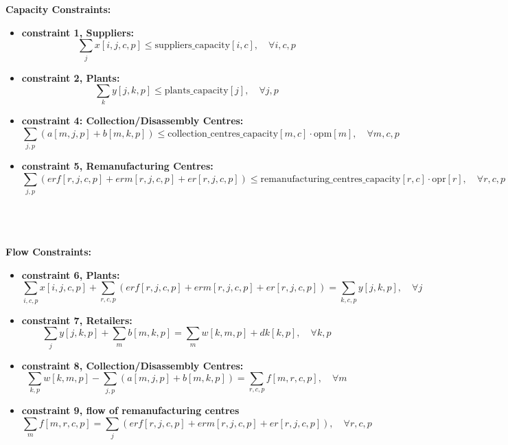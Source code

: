 \documentclass{article}
\begin{document}
    \textbf{Capacity Constraints:}
    \begin{itemize}
        \item \textbf{constraint 1, Suppliers:}
        \[
            \sum_{j} x[i,j,c,p] \leq \text{suppliers\_capacity}[i,c], \quad \forall i, c, p
        \]

        \item \textbf{constraint 2, Plants:}
        \[
            \sum_{k} y[j,k,p] \leq \text{plants\_capacity}[j], \quad \forall j, p
        \]

        \item \textbf{constraint 4: Collection/Disassembly Centres:}
        \[
            \sum_{j,p} (a[m,j,p] + b[m,k,p]) \leq \text{collection\_centres\_capacity}[m,c] \cdot \text{opm}[m], \quad \forall m, c, p
        \]

        \item \textbf{constraint 5, Remanufacturing Centres:}
        \[
            \sum_{j,p} (erf[r,j,c,p] + erm[r,j,c,p] + er[r,j,c,p]) \leq \text{remanufacturing\_centres\_capacity}[r,c] \cdot \text{opr}[r], \quad \forall r, c, p
        \]\\
        \\
        \\
    \end{itemize}

    \textbf{Flow Constraints:}
    \begin{itemize}
        \item \textbf{constraint 6, Plants:}
        \[
            \sum_{i,c,p} x[i,j,c,p] + \sum_{r,c,p} (erf[r,j,c,p] + erm[r,j,c,p] + er[r,j,c,p]) = \sum_{k,c,p} y[j,k,p], \quad \forall j
        \]

        \item \textbf{constraint 7, Retailers:}
        \[
            \sum_{j} y[j,k,p]  +\sum_{m} b[m,k,p] = \sum_{m} w[k,m,p]+ dk[k,p], \quad \forall k, p
        \]

        \item \textbf{constraint 8, Collection/Disassembly Centres:}
        \[
            \sum_{k,p} w[k,m,p] - \sum_{j,p} (a[m,j,p] + b[m,k,p]) = \sum_{r,c,p} f[m,r,c,p], \quad \forall m
        \]
        \item \textbf{constraint 9, flow of remanufacturing centres}
        \[
            \sum_{m} f[m,r,c,p] =  \sum_{j} (erf[r,j,c,p] + erm[r,j,c,p]+ er[r,j,c,p]), \quad \forall r,c,p
        \]
        \\
        \\
        \\

    \end{itemize}
\end{document}
